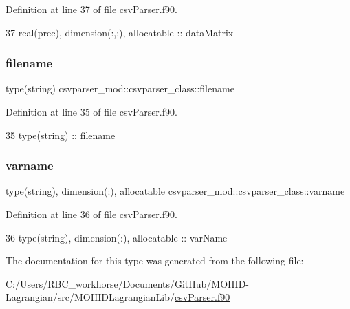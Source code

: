 Definition at line 37 of file csv\+Parser.\+f90.


\begin{DoxyCode}
37         \textcolor{keywordtype}{real(prec)}, \textcolor{keywordtype}{dimension(:,:)}, \textcolor{keywordtype}{allocatable} :: dataMatrix
\end{DoxyCode}
\mbox{\label{structcsvparser__mod_1_1csvparser__class_aa3632225cd36ea1ad9e8c0493a218886}} 
\subsubsection{\texorpdfstring{filename}{filename}}
{\footnotesize\ttfamily type(string) csvparser\+\_\+mod\+::csvparser\+\_\+class\+::filename\hspace{0.3cm}{\ttfamily [private]}}



Definition at line 35 of file csv\+Parser.\+f90.


\begin{DoxyCode}
35         \textcolor{keywordtype}{type}(string) :: filename
\end{DoxyCode}
\mbox{\label{structcsvparser__mod_1_1csvparser__class_acad38d37d73d0cb6ca80f98cde3d56b4}} 
\subsubsection{\texorpdfstring{varname}{varname}}
{\footnotesize\ttfamily type(string), dimension(\+:), allocatable csvparser\+\_\+mod\+::csvparser\+\_\+class\+::varname\hspace{0.3cm}{\ttfamily [private]}}



Definition at line 36 of file csv\+Parser.\+f90.


\begin{DoxyCode}
36         \textcolor{keywordtype}{type}(string), \textcolor{keywordtype}{dimension(:)}, \textcolor{keywordtype}{allocatable} :: varName
\end{DoxyCode}


The documentation for this type was generated from the following file\+:\begin{DoxyCompactItemize}
\item 
C\+:/\+Users/\+R\+B\+C\+\_\+workhorse/\+Documents/\+Git\+Hub/\+M\+O\+H\+I\+D-\/\+Lagrangian/src/\+M\+O\+H\+I\+D\+Lagrangian\+Lib/\mbox{\hyperlink{csv_parser_8f90}{csv\+Parser.\+f90}}\end{DoxyCompactItemize}

